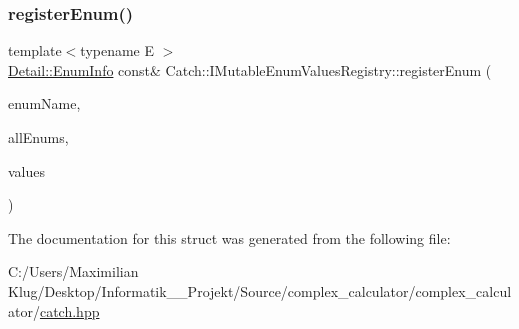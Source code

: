 \subsubsection{\texorpdfstring{register\+Enum()}{registerEnum()}\hspace{0.1cm}{\footnotesize\ttfamily [2/2]}}
{\footnotesize\ttfamily template$<$typename E $>$ \\
\mbox{\hyperlink{struct_catch_1_1_detail_1_1_enum_info}{Detail\+::\+Enum\+Info}} const\& Catch\+::\+I\+Mutable\+Enum\+Values\+Registry\+::register\+Enum (\begin{DoxyParamCaption}\item[{\mbox{\hyperlink{class_catch_1_1_string_ref}{String\+Ref}}}]{enum\+Name,  }\item[{\mbox{\hyperlink{class_catch_1_1_string_ref}{String\+Ref}}}]{all\+Enums,  }\item[{std\+::initializer\+\_\+list$<$ E $>$}]{values }\end{DoxyParamCaption})\hspace{0.3cm}{\ttfamily [inline]}}



The documentation for this struct was generated from the following file\+:\begin{DoxyCompactItemize}
\item 
C\+:/\+Users/\+Maximilian Klug/\+Desktop/\+Informatik\+\_\+\_\+\+Projekt/\+Source/complex\+\_\+calculator/complex\+\_\+calculator/\mbox{\hyperlink{catch_8hpp}{catch.\+hpp}}\end{DoxyCompactItemize}
